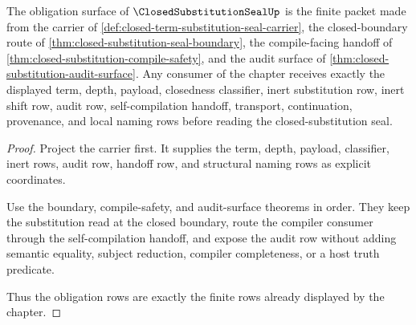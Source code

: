 \begin{theorem}
\label{thm:closed-substitution-seal-obligation-rows}
The obligation surface of $\ClosedSubstitutionSealUp$ is the finite packet made from the carrier of \autoref{def:closed-term-substitution-seal-carrier}, the closed-boundary route of \autoref{thm:closed-substitution-seal-boundary}, the compile-facing handoff of \autoref{thm:closed-substitution-compile-safety}, and the audit surface of \autoref{thm:closed-substitution-audit-surface}. Any consumer of the chapter receives exactly the displayed term, depth, payload, closedness classifier, inert substitution row, inert shift row, audit row, self-compilation handoff, transport, continuation, provenance, and local naming rows before reading the closed-substitution seal.
\end{theorem}
\begin{proof}
Project the carrier first. It supplies the term, depth, payload, classifier, inert rows, audit row, handoff row, and structural naming rows as explicit coordinates.

Use the boundary, compile-safety, and audit-surface theorems in order. They keep the substitution read at the closed boundary, route the compiler consumer through the self-compilation handoff, and expose the audit row without adding semantic equality, subject reduction, compiler completeness, or a host truth predicate.

Thus the obligation rows are exactly the finite rows already displayed by the chapter.
\end{proof}

